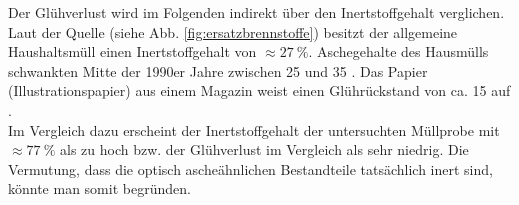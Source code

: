 Der Glühverlust wird im Folgenden indirekt über den Inertstoffgehalt verglichen. Laut der Quelle (siehe Abb. \ref{fig:ersatzbrennstoffe}) besitzt der allgemeine Haushaltsmüll einen Inertstoffgehalt von $\approx \SI{27}{\percent}$. 
Aschegehalte des Hausmülls schwankten Mitte der 1990er Jahre zwischen \SI{25}{\mpercent} und \SI{35}{\mpercent} \cite{scholz2013}.
Das Papier (Illustrationspapier) aus einem Magazin weist einen Glührückstand von ca. \SI{15}{\mpercent} auf \cite{roempppap}.\\
Im Vergleich dazu erscheint der Inertstoffgehalt der untersuchten Müllprobe mit $\approx \SI{77}{\percent}$ als zu hoch bzw. der Glühverlust im Vergleich als sehr niedrig. Die Vermutung, dass die optisch ascheähnlichen Bestandteile tatsächlich inert sind, könnte man somit begründen.\\ \\
